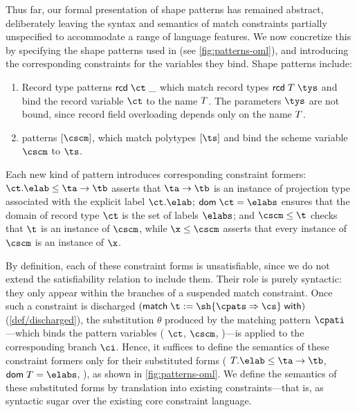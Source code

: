 \documentclass[acmsmall,screen,nonacm%
\Anonymous{,anonymous}{}%
\Final{}{,review}%
]{acmart}
\begin{document}
Thus far, our formal presentation of shape patterns has remained
abstract, deliberately leaving the syntax and semantics of match constraints
partially unspecified to accommodate a range of language features. We now
concretize this by specifying the shape patterns used in \OML
(see \cref{fig:patterns-oml}), and introducing the corresponding constraints
for the variables they bind.
%
Shape patterns include:
\begin{enumerate}

  \item Record type patterns $\cpatrcd \ct$ which match record types $\trcd \T \tys$
    and bind the record variable $\ct$ to the name $T$. 
    The parameters $\tys$ are not bound, since record
    field overloading depends only on the name $T$.

  \item \Polytype patterns $\cpatpoly \cscm$, which match polytypes $\tpoly \ts$ and
    bind the scheme variable $\cscm$ to $\ts$.
\end{enumerate}

Each new kind of pattern introduces corresponding constraint formers:
$\labfrom \elab \ct \leq \ta \to \tb$ asserts that $\ta \to \tb$ is an
instance of projection type associated with the explicit label $\labfrom
\elab \ct$; $\dom \ct = \elabs$ ensures that the domain of record type
$\ct$ is the set of labels $\elabs$; and $\cscm \leq \t$ checks that $\t$ is
an instance of $\cscm$, while $\x \leq \cscm$ asserts that every instance of
$\cscm$ is an instance of $\x$.

By definition, each of these constraint forms is unsatisfiable, since we do not
extend the satisfiability relation to include them. Their role is purely
syntactic: they only appear within the branches of a suspended match
constraint. Once such a constraint is discharged $(\cmatched \t \sh {\cbranch
\cpats \cs})$ (\cref {def/discharged}), the substitution $\theta$ produced by
the matching pattern $\cpati$---which binds the pattern variables (\eg
$\ct$, $\cscm$, \etc)---is
applied to the corresponding branch $\ci$. Hence, it suffices to define
the semantics of these constraint formers only for their substituted forms (\eg
$\labfrom \elab \T \leq \ta \to \tb$, $\dom {\T} = \elabs$, \etc), as shown in
\cref{fig:patterns-oml}. We define the semantics of these substituted forms by
translation into existing constraints---that is, as syntactic sugar over the
existing core constraint language.
\end{document}
